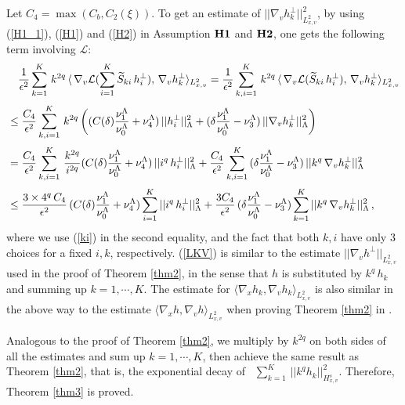 \documentclass[final,onefignum,onetabnum]{siamart171218}
\begin{document}
Let $C_4=\max(C_b, C_2(\xi))$. To get an estimate of $||\nabla_v h_k^{\perp}||_{L^2_{x,v}}^2$, by using (\ref{H1_1}), (\ref{H1}) and (\ref{H2}) in Assumption ${\bf H1}$ and ${\bf H2}$, one gets the following term involving $\mathcal L$:
\begin{align}
&\displaystyle \quad \frac{1}{\epsilon^2}\sum_{k=1}^{K}\, k^{2q}\, \langle\, \nabla_v\mathcal L(\sum_{i=1}^{K}\widetilde S_{ki}\, h_i^{\perp}), \, \nabla_v h_k^{\perp}\rangle_{L^2_{x,v}}
=\frac{1}{\epsilon^2} \sum_{k,i=1}^{K}\, k^{2q}\, \langle\, \nabla_v\mathcal L(\widetilde S_{ki}\, h_i^{\perp}), \, \nabla_v h_k^{\perp}\rangle_{L^2_{x,v}}\notag \notag\\[2pt]
&\displaystyle \leq \frac{C_4}{\epsilon^2}\sum_{k,i=1}^{K}\, k^{2q} \left( (C(\delta)\frac{\nu_1^{\Lambda}}{\nu_0^{\Lambda}} + \nu_4^{\Lambda})\, ||h_i^{\perp}||_{\Lambda}^2 +
(\delta\frac{\nu_1^{\Lambda}}{\nu_0^{\Lambda}}-\nu_3^{\Lambda})\, ||\nabla_v h_k^{\perp}||_{\Lambda}^2  \right) \notag \\[2pt]
&\displaystyle = \frac{C_4}{\epsilon^2}\sum_{k,i=1}^{K}\, \frac{k^{2q}}{i^{2q}} (C(\delta)\frac{\nu_1^{\Lambda}}{\nu_0^{\Lambda}} + \nu_4^{\Lambda})\, ||i^q\, h_i^{\perp}||_{\Lambda}^2 + \frac{C_4}{\epsilon^2}\sum_{k,i=1}^{K}\, (\delta\frac{\nu_1^{\Lambda}}{\nu_0^{\Lambda}}-\nu_3^{\Lambda})\, ||k^q\, \nabla_v h_k^{\perp}||_{\Lambda}^2 \notag\\[2pt]
&\displaystyle\label{LKV} \leq \frac{3\times 4^{q}\, C_4}{\epsilon^2}\, (C(\delta)\frac{\nu_1^{\Lambda}}{\nu_0^{\Lambda}} + \nu_4^{\Lambda}) \sum_{i=1}^{K} ||i^q\,  h_i^{\perp}||_{\Lambda}^2 + \frac{3 C_4}{\epsilon^2}\, (\delta\frac{\nu_1^{\Lambda}}{\nu_0^{\Lambda}}-\nu_3^{\Lambda})\sum_{k=1}^{K} ||k^q \, \nabla_v h_k^{\perp}||_{\Lambda}^2\,,
\end{align}
where we use (\ref{ki}) in the second equality, and the fact that both $k, i$ have only 3 choices for a fixed $i, k$, respectively. (\ref{LKV}) is similar to
the estimate $||\nabla_v h^{\perp}||_{L^2_{x,v}}$ used in the proof of Theorem \ref{thm2}, in the sense that $h$ is substituted by $k^q\, h_k$ and summing up $k=1, \cdots, K$.
The estimate for $\langle \nabla_x h_k, \nabla_v h_k\rangle_{L^2_{x,v}}$ is also similar in the above way to the estimate $\langle\nabla_x h,
\nabla_v h\rangle_{L^2_{x,v}}$ when proving Theorem \ref{thm2} in \cite{MB}.

Analogous to the proof of Theorem \ref{thm2}, we multiply by $k^{2q}$ on both sides of all the estimates and sum up $k=1, \cdots, K$,
then achieve the same result as Theorem \ref{thm2}, that is, the exponential decay of \, $\sum_{k=1}^{K}\, ||k^q h_k||_{H_{x,v}^s}^2$.
Therefore, Theorem \ref{thm3} is proved.    \\[1pt]
\end{document}
